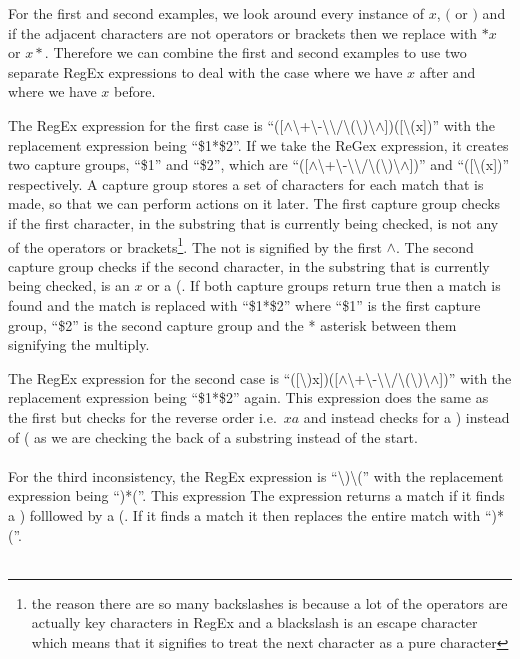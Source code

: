 \documentclass{report}
\begin{document}
For the first and second examples, we look around every instance of $x$, $($ or $)$ and if the adjacent characters are not operators or brackets then we replace with $*x$ or $x*$. Therefore we can combine the first and second examples to use two separate RegEx expressions to deal with the case where we have $x$ after and where we have $x$ before.\par
The RegEx expression for the first case is
``([$\wedge$\textbackslash+\textbackslash-\textbackslash*\textbackslash/\textbackslash(\textbackslash)\textbackslash$\wedge$])([\textbackslash(x])''
with the replacement expression being ``\$1*\$2''. If we take the ReGex expression, it creates two capture groups, ``\$1'' and ``\$2'', which are ``([$\wedge$\textbackslash+\textbackslash-\textbackslash*\textbackslash/\textbackslash(\textbackslash)\textbackslash$\wedge$])'' and ``([\textbackslash(x])'' respectively. A capture group stores a set of characters for each match that is made, so that we can perform actions on it later. The first capture group checks if the first character, in the substring that is currently being checked, is not any of the operators or brackets\footnote{the reason there are so many backslashes is because a lot of the operators are actually key characters in RegEx and a blackslash is an escape character which means that it signifies to treat the next character as a pure character}. The not is signified by the first $\wedge$. The second capture group checks if the second character, in the substring that is currently being checked, is an $x$ or a (. If both capture groups return true then a match is found and the match is replaced with ``\$1*\$2'' where ``\$1'' is the first capture group, ``\$2'' is the second capture group and the * asterisk between them signifying the multiply.\par
The RegEx expression for the second case is
``([\textbackslash)x])([$\wedge$\textbackslash+\textbackslash-\textbackslash*\textbackslash/\textbackslash(\textbackslash)\textbackslash$\wedge$])''
with the replacement expression being ``\$1*\$2'' again. This expression does the same as the first but checks for the reverse order i.e.\ $xa$ and instead checks for a ) instead of ( as we are checking the back of a substring instead of the start.\\ \\
For the third inconsistency, the RegEx expression is
``\textbackslash)\textbackslash(''
with the replacement expression being ``)*(''. This expression The expression returns a match if it finds a ) folllowed by a (. If it finds a match it then replaces the entire match with ``)*(''.\\ \\
\end{document}
